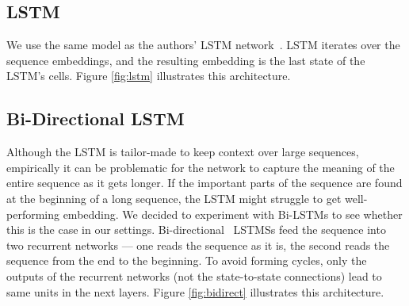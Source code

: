 \documentclass{article} \usepackage{nips15submit_e,times}
\begin{document}
\subsection{LSTM}
We use the same model as the authors' LSTM network~\cite{Lowe2015}.
LSTM iterates over the sequence embeddings, and the resulting embedding is the last state of the LSTM's cells.
Figure \ref{fig:lstm} illustrates this architecture.





\subsection{Bi-Directional LSTM}
Although the LSTM is tailor-made to keep context over large sequences,
empirically it can be problematic for the network to capture the meaning of the entire sequence as it gets
longer.
If the important parts of the sequence are found at the beginning of a long sequence, the LSTM might struggle to get well-performing embedding.
We decided to experiment with Bi-LSTMs to see whether this is the case in our settings.
Bi-directional~\cite{Schuster1997} LSTMSs feed the sequence into two recurrent networks --- one reads the sequence as it is, the second reads the sequence from the end to the beginning.
To avoid forming cycles, only the outputs of the recurrent networks (not the state-to-state connections) lead to same units in the next layers.
Figure \ref{fig:bidirect} illustrates this architecture.
\end{document}
